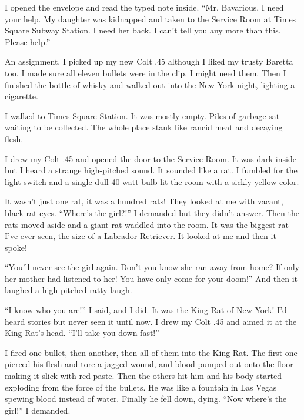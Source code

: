 I opened the envelope and read the typed note inside. ``Mr.
Bavarious, I need your help. My daughter was kidnapped and taken to
the Service Room at Times Square Subway Station. I need her back. I
can't tell you any more than this. Please help.''



An assignment. I picked up my new Colt .45 although I liked my
trusty Baretta too. I made sure all eleven bullets were in the
clip. I might need them. Then I finished the bottle of whisky and
walked out into the New York night, lighting a cigarette.



I walked to Times Square Station. It was mostly empty. Piles of
garbage sat waiting to be collected. The whole place stank like
rancid meat and decaying flesh.



I drew my Colt .45 and opened the door to the Service Room. It was
dark inside but I heard a strange high-pitched sound. It sounded
like a rat. I fumbled for the light switch and a single dull
40-watt bulb lit the room with a sickly yellow color.



It wasn't just one rat, it was a hundred rats! They looked at me
with vacant, black rat eyes. ``Where's the girl?!'' I demanded but
they didn't answer. Then the rats moved aside and a giant rat
waddled into the room. It was the biggest rat I've ever seen, the
size of a Labrador Retriever. It looked at me and then it
spoke!



``You'll never see the girl again. Don't you know she ran away from
home? If only her mother had listened to her! You have only come
for your doom!'' And then it laughed a high pitched ratty
laugh.



``I know who you are!'' I said, and I did. It was the King Rat of New
York! I'd heard stories but never seen it until now. I drew my Colt
.45 and aimed it at the King Rat's head. ``I'll take you down
fast!''



I fired one bullet, then another, then all of them into the King
Rat. The first one pierced his flesh and tore a jagged wound, and
blood pumped out onto the floor making it slick with red paste.
Then the others hit him and his body started exploding from the
force of the bullets. He was like a fountain in Las Vegas spewing
blood instead of water. Finally he fell down, dying. ``Now where's
the girl!'' I demanded.




